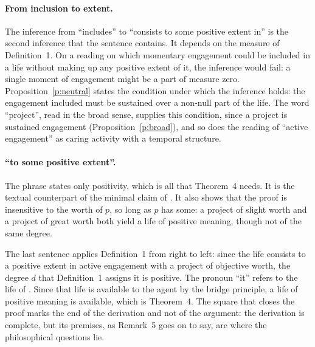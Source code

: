 \paragraph{From inclusion to extent.} The inference from \enquote{includes} to \enquote{consists to some positive extent in} is the second inference that the sentence contains. It depends on the measure of Definition~1. On a reading on which momentary engagement could be included in a life without making up any positive extent of it, the inference would fail: a single moment of engagement might be a part of measure zero. Proposition~\ref{p:neutral} states the condition under which the inference holds: the engagement included must be sustained over a non-null part of the life. The word \enquote{project}, read in the broad sense, supplies this condition, since a project is sustained engagement (Proposition~\ref{p:broad}), and so does the reading of \enquote{active engagement} as caring activity with a temporal structure.

\paragraph{\enquote{to some positive extent}.} The phrase states only positivity, which is all that Theorem~4 needs. It is the textual counterpart of the minimal claim of . It also shows that the proof is insensitive to the worth of $p$, so long as $p$ has some: a project of slight worth and a project of great worth both yield a life of positive meaning, though not of the same degree.


The last sentence applies Definition~1 from right to left: since the life consists to a positive extent in active engagement with a project of objective worth, the degree $d$ that Definition~1 assigns it is positive. The pronoun \enquote{it} refers to the life of . Since that life is available to the agent by the bridge principle, a life of positive meaning is available, which is Theorem~4. The square that closes the proof marks the end of the derivation and not of the argument: the derivation is complete, but its premises, as Remark~5 goes on to say, are where the philosophical questions lie.

